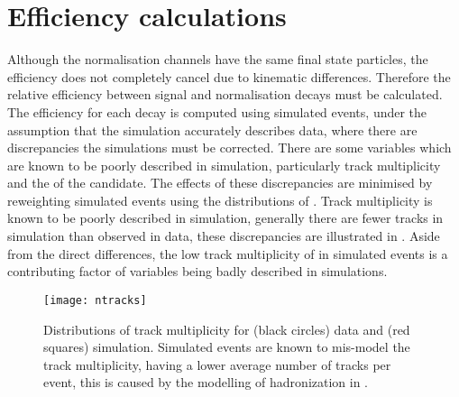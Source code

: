 \section{Efficiency calculations}
\label{sec:hhh:eff}

Although the normalisation channels have the same final state particles, the efficiency does not
completely cancel due to kinematic differences.
Therefore the relative efficiency between signal and normalisation decays must be calculated.
The efficiency for each decay is computed using simulated events, under the assumption that the
simulation accurately describes data, where there are discrepancies the simulations must be corrected.
There are some variables which are known to be poorly described in simulation, particularly track
multiplicity and the \chisqvtx of the \Bp candidate.
The effects of these discrepancies are minimised by reweighting simulated events using
the distributions of \btojpsikpipi.
Track multiplicity is known to be poorly described in simulation, generally there are fewer tracks
in simulation than observed in data,
these discrepancies are
 illustrated in
.
Aside from the direct differences, the low track multiplicity of in simulated events is a
contributing factor of \pid variables being badly described in simulations.

\begin{figure}[t]
  \begin{center}
    \texttt{[image: ntracks]}
    \caption[Comparison of track multiplicity between data and simulation]
    {
      Distributions of track multiplicity for (black circles) data and (red squares) simulation.
      Simulated events are known to mis-model the track multiplicity, having a lower average number
      of tracks per event, this is caused by the modelling of hadronization in \pythia.
    }
    \label{fig:hhh:ntracks}
  \end{center}
\end{figure}

